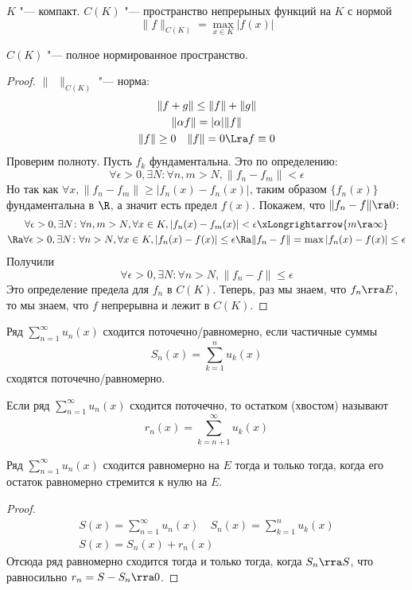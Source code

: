 \begin{Def}
	$K$ "--- компакт. $C(K)$ "--- пространство непрерыных функций на $K$ с нормой
	\[ \|f\|_{C(K)} = \max_{x \in K} |f(x)| \]
\end{Def}
\begin{theorem}
	$C(K)$ "--- полное нормированное пространство.
\end{theorem}
\begin{proof}
	$\|\phantom{f}\|_{C(K)}$ "--- норма:
	\begin{gather*}
		\| f + g \| \le \| f \| + \| g \| \\
		\| \alpha f \| = |\alpha| \| f \| \\
		\| f \| \ge 0 \quad \| f \| = 0 \Lra f \equiv 0
	\end{gather*}
	Проверим полноту.
	Пусть $f_k$ фундаментальна.
	Это по определению:
	\[ \forall \epsilon > 0, \exists N\colon \forall n,m > N, \| f_n - f_m \| < \epsilon \]
	Но так как $\forall x, \| f_n - f_m \| \ge |f_n(x) - f_n(x)|$, таким образом $\{f_n(x)\}$ фундаментальна в $\R$, а значит есть предел $f(x)$.
	Покажем, что $\| f_n - f \| \ra 0$:
	\begin{gather*}
		\forall \epsilon > 0, \exists N\colon \forall n,m > N, \forall x \in K, |f_n(x) - f_m(x)| < \epsilon \xLongrightarrow{m \ra \infty} \\
		\Ra \forall \epsilon > 0, \exists N\colon \forall n > N, \forall x \in K, |f_n(x) - f(x)| \le \epsilon
		\Ra \| f_n - f \| = \max |f_n(x) - f(x)| \le \epsilon
	\end{gather*}
	Получили
	\[ \forall \epsilon > 0, \exists N\colon \forall n > N, \| f_n - f \| \le \epsilon \]
	Это определение предела для $f_n$ в $C(K)$.
	Теперь, раз мы знаем, что $f_n \rra E$, то мы знаем, что $f$ непрерывна и лежит в $C(K)$.
\end{proof}

\begin{Def}
	Ряд $\sum_{n=1}^\infty u_n(x)$ сходится поточечно/равномерно, если частичные суммы
	\[ S_n(x) = \sum_{k=1}^n u_k(x) \]
	сходятся поточечно/равномерно.
\end{Def}

\begin{Def}
	Если ряд $\sum_{n=1}^\infty u_n(x)$ сходится поточечно, то остатком (хвостом) называют
	\[ r_n(x) = \sum_{k=n+1}^\infty u_k(x) \]
\end{Def}

\begin{theorem}
	Ряд $\sum_{n=1}^\infty u_n(x)$ сходится равномерно на $E$ тогда и только тогда, когда его остаток равномерно стремится к нулю на $E$.
\end{theorem}
\begin{proof}
	\begin{gather*}
		S(x) = \sum_{n=1}^\infty u_n(x) \quad S_n(x) = \sum_{k=1}^n u_k(x) \\
		S(x) = S_n(x) + r_n(x)
	\end{gather*}
	Отсюда ряд равномерно сходится тогда и только тогда, когда $S_n \rra S$, что равносильно $r_n = S - S_n \rra 0$.
\end{proof}

